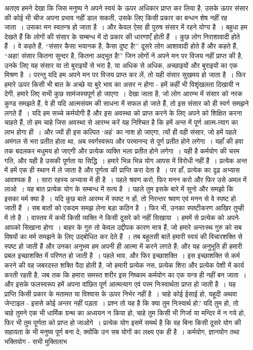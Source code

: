 अतएव हमने देखा कि जिस मनुष्य ने अपने स्वयं के ऊपर अधिकार प्राप्त कर लिया है, उसके ऊपर संसार की कोई भी चीज अपना प्रभाव नहीं डाल सकती, उसके लिए किसी प्रकार का बन्धन शेष नहीं रह जाता~। उसका मन स्वतन्त्र हो जाता है~। और केवल ऐसा ही पुरुष संसार में रहने योग्य है~। बहुधा हम देखते हैं कि लोगों की संसार के सम्बन्ध में दो प्रकार की धारणाएँ होती हैं~। कुछ लोग निराशावादी होते हैं~। वे कहते हैं, “संसार कैसा भयानक है, कैसा दुष्ट है!” दूसरे लोग आशावादी होते हैं और कहते हैं, “अहा! संसार कितना सुन्दर है, कितना अद्भुत है!” जिन लोगों ने अपने मन पर विजय नहीं प्राप्त की है, उनके लिए यह संसार या तो बुराइयों से भरा है, या अधिक से अधिक, अच्छाइयों और बुराइयों का एक मिश्रण है~। परन्तु यदि हम अपने मन पर विजय प्राप्त कर लें, तो यही संसार सुखमय हो जाता है~। फिर हमारे ऊपर किसी भी बात के अच्छे या बुरे भाव का असर न होगा - हमें कहीं भी विशृंखलता दिखायी न देगी, हमारे लिए सभी कुछ सामंजस्यपूर्ण हो जाएगा~। देखा जाता है, जो लोग आरम्भ में संसार को नरक कुण्ड समझते हैं, वे ही यदि आत्मसंयम की साधना में सफल हो जाते हैं, तो इस संसार को ही स्वर्ग समझने लगते हैं~। यदि हम सच्चे कर्मयोगी हैं और इस अवस्था को प्राप्त करने के लिए अपने को शिक्षित करना चाहते हैं, तो हम चाहे जिस अवस्था से आरम्भ करें यह निश्चित है कि हमें अन्त में पूर्ण आत्म-त्याग का लाभ होगा ही~। और ज्यों ही इस कल्पित ‘अहं’ का नाश हो जाएगा, त्यों ही वही संसार, जो हमें पहले अमंगल से भरा प्रतीत होता था, अब स्वर्गस्वरूप और परमानन्द से पूर्ण प्रतीत होने लगेगा~। यहाँ की हवा तक बदलकर मधुमय हो जाएगी और प्रत्येक व्यक्ति भला प्रतीत होने लगेगा~। यही है कर्मयोग की चरम गति, और यही है उसकी पूर्णता या सिद्धि~। हमारे भिन्न भिन्न योग आपस में विरोधी नहीं हैं~। प्रत्येक अन्त में हमें एक ही स्थान में ले जाता है और पूर्णत्व की प्राप्ति करा देता है~। पर हाँ, प्रत्येक का दृढ़ अभ्यास आवश्यक है~। सारा रहस्य अभ्यास में ही है~। पहले श्रवण करो, फिर मनन करो और फिर उसे अमल में लाओ~। यह बात प्रत्येक योग के सम्बन्ध में सत्य है~। पहले तुम इसके बारे में सुनो और समझो कि इसका मर्म क्या है~। यदि कुछ बाते आरम्भ में स्पष्ट न हों, तो निरन्तर श्रवण एवं मनन से वे स्पष्ट हो जाती हैं~। सब बातों को एकदम समझ लेना बड़ा कठिन है~। फिर भी, उनका स्पष्टीकरण आखिर तुम्ही में तो है~। वास्तव में कभी किसी व्यक्ति ने किसी दूसरे को नहीं सिखाया~। हममें से प्रत्येक को अपने-आपको सिखाना होगा~। बाहर के गुरु तो केवल उद्दीपक कारण मात्र हैं, जो हमारे अन्तःस्थ गुरु को सब विषयों का मर्म समझने के लिए उद्बोधित कर देते हैं~। तब बहुतसी बातें हमारी स्वयं की विचारशक्ति से स्पष्ट हो जाती हैं और उनका अनुभव हम अपनी ही आत्मा में करने लगते हैं; और यह अनुभूति ही हमारी प्रबल इच्छाशक्ति में परिणत हो जाती है~। पहले भाव, और फिर इच्छाशक्ति~। इस इच्छाशक्ति से कर्म करने की वह जबरदस्त शक्ति पैदा होती है, जो हमारी प्रत्येक नस, प्रत्येक शिरा और प्रत्येक पेशी में कार्य करती रहती है, जब तक कि हमारा समस्त शरीर इस निष्काम कर्मयोग का एक यन्त्र ही नहीं बन जाता~। और इसके फलस्वरूप हमें अपना वांछित पूर्ण आत्मत्याग एवं परम निःस्वार्थता प्राप्त हो जाती है~। यह प्राप्ति किसी प्रकार के मतामत या विश्वास के ऊपर निर्भर नहीं है~। चाहे कोई ईसाई हो, यहूदी अथवा जेन्टाइल - इससे कोई अन्तर नहीं पड़ता~। प्रश्न तो यह है कि क्या तुम निःस्वार्थ हो? यदि तुम हो, तो चाहे तुमने एक भी धार्मिक ग्रन्थ का अध्ययन न किया हो, चाहे तुम किसी भी गिर्जा या मन्दिर में न गये हो, फिर भी तुम पूर्णता को प्राप्त हो जाओगे~। प्रत्येक योग इसमें समर्थ है कि वह बिना किसी दूसरे योग की सहायता के भी मनुष्य पूर्ण बना दे; क्योंकि उन सब योगों का लक्ष्य एक ही है~। कर्मयोग, ज्ञानयोग तथा भक्तियोग - सभी मुक्तिलाभ 
